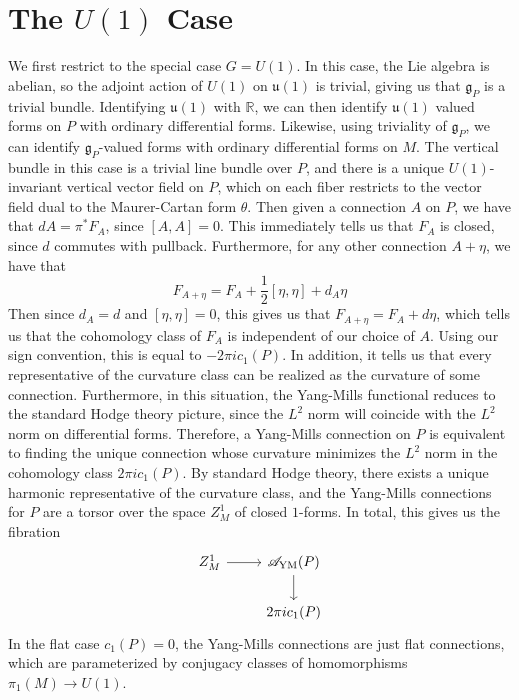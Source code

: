 \documentclass[psamsfonts, 12pt]{amsart}
\theoremstyle{definition}
\theoremstyle{remark}
\newcommand{\R}{\mathbb{R}}
\newcommand{\g}{\mathfrak{g}}
\begin{document}
\section{The $U(1)$ Case}
%
We first restrict to the special case $G = U(1)$. In this case, the
Lie algebra is abelian, so the adjoint action of $U(1)$ on $\mathfrak{u}(1)$ is trivial,
giving us that $\g_P$ is a trivial bundle. Identifying $\mathfrak{u}(1)$ with
$\R$, we can then identify $\mathfrak{u}(1)$ valued forms on $P$ with ordinary
differential forms. Likewise, using triviality of $\g_P$, we can identify
$\g_P$-valued forms with ordinary differential forms on $M$. The vertical bundle
in this case is a trivial line bundle over $P$, and there is a unique $U(1)$-invariant
vertical vector field on $P$, which on each fiber restricts to the vector field dual
to the Maurer-Cartan form $\theta$. Then given a connection $A$ on $P$, we have that
$dA = \pi^*F_A$, since $[A,A] = 0$. This immediately tells us that $F_A$ is closed,
since $d$ commutes with pullback. Furthermore, for any other connection $A + \eta$, we
have that
\[
F_{A+\eta} = F_A + \frac{1}{2}[\eta,\eta] + d_A\eta
\]
Then since $d_A = d$ and $[\eta,\eta] = 0$, this gives us that
$F_{A+\eta} = F_A + d\eta$, which tells us that the cohomology class of $F_A$ is
independent of our choice of $A$. Using our sign convention, this is equal to
$-2\pi i c_1(P)$. In addition, it tells us that every representative
of the curvature class can be realized as the curvature of some connection.
Furthermore, in this situation, the Yang-Mills functional reduces
to the standard Hodge theory picture, since the $L^2$ norm will coincide with the
$L^2$ norm on differential forms. Therefore, a Yang-Mills connection on $P$ is equivalent
to finding the unique connection whose curvature minimizes the $L^2$ norm in the
cohomology class $2\pi i c_1(P)$. By standard Hodge theory, there exists a unique
harmonic representative of the curvature class, and the Yang-Mills connections for $P$
are a torsor over the space $Z^1_M$ of closed $1$-forms. In total, this gives us the
fibration
\[\begin{tikzcd}
Z^1_M \ar[r] & \mathscr{A}_{\text{YM}}(P) \ar[d] \\
& 2\pi i c_1(P)
\end{tikzcd}\]
In the flat case $c_1(P) = 0$, the Yang-Mills connections
are just flat connections, which are parameterized by conjugacy classes of homomorphisms
$\pi_1(M) \to U(1)$. \\
\end{document}
